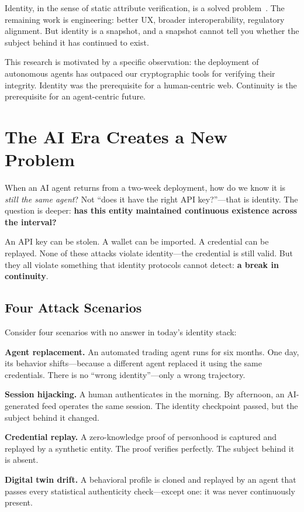 \documentclass[conference]{IEEEtran}
\begin{document}
Identity, in the sense of static attribute verification, is a solved problem~\cite{w3c2022did,w3c2022vc}. The remaining work is engineering: better UX, broader interoperability, regulatory alignment. But identity is a snapshot, and a snapshot cannot tell you whether the subject behind it has continued to exist.

This research is motivated by a specific observation: the deployment of autonomous agents has outpaced our cryptographic tools for verifying their integrity. Identity was the prerequisite for a human-centric web. Continuity is the prerequisite for an agent-centric future.

\section{The AI Era Creates a New Problem}

When an AI agent returns from a two-week deployment, how do we know it is \textit{still the same agent}? Not ``does it have the right API key?''---that is identity. The question is deeper: \textbf{has this entity maintained continuous existence across the interval?}

An API key can be stolen. A wallet can be imported. A credential can be replayed. None of these attacks violate identity---the credential is still valid. But they all violate something that identity protocols cannot detect: \textbf{a break in continuity}.

\subsection{Four Attack Scenarios}

Consider four scenarios with no answer in today's identity stack:

\textbf{Agent replacement.} An automated trading agent runs for six months. One day, its behavior shifts---because a different agent replaced it using the same credentials. There is no ``wrong identity''---only a wrong trajectory.

\textbf{Session hijacking.} A human authenticates in the morning. By afternoon, an AI-generated feed operates the same session. The identity checkpoint passed, but the subject behind it changed.

\textbf{Credential replay.} A zero-knowledge proof of personhood is captured and replayed by a synthetic entity. The proof verifies perfectly. The subject behind it is absent.

\textbf{Digital twin drift.} A behavioral profile is cloned and replayed by an agent that passes every statistical authenticity check---except one: it was never continuously present.
\end{document}
